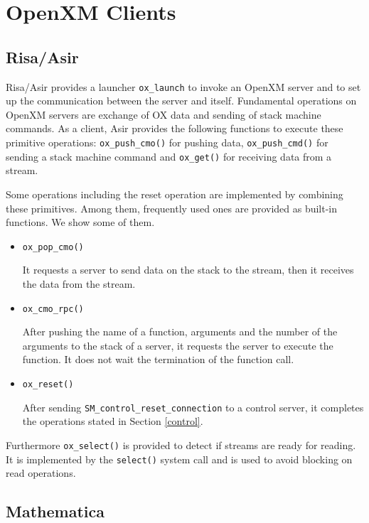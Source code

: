 
\section{OpenXM Clients}    

\subsection{Risa/Asir}

Risa/Asir provides a launcher {\tt ox\_launch}
to invoke an OpenXM server and to set up the
communication between the server and itself.
Fundamental operations on OpenXM servers are 
exchange of OX data and sending of stack machine commands.
As a client, Asir provides the following functions
to execute these primitive operations:
{\tt ox\_push\_cmo()} for pushing data,
{\tt ox\_push\_cmd()} for sending a stack machine command
and {\tt ox\_get()} for receiving data from a stream.

Some operations including the reset operation are implemented by
combining these primitives.  Among them, frequently used ones are
provided as built-in functions. We show some of them.

\begin{itemize}
\item {\tt ox\_pop\_cmo()}

It requests a server to send data on the stack to the stream, then
it receives the data from the stream.

\item {\tt ox\_cmo\_rpc()}

After pushing the name of a function, arguments and the number of the
arguments to the stack of a server, it requests the server to execute
the function. It does not wait the termination of the function call.

\item {\tt ox\_reset()}

After sending {\tt SM\_control\_reset\_connection} to a control server,
it completes the operations stated in Section \ref{control}.
\end{itemize}
Furthermore {\tt ox\_select()} is provided to detect if streams are ready for
reading. It is implemented by the {\tt select()} system call and is used
to avoid blocking on read operations.

\subsection{Mathematica}

